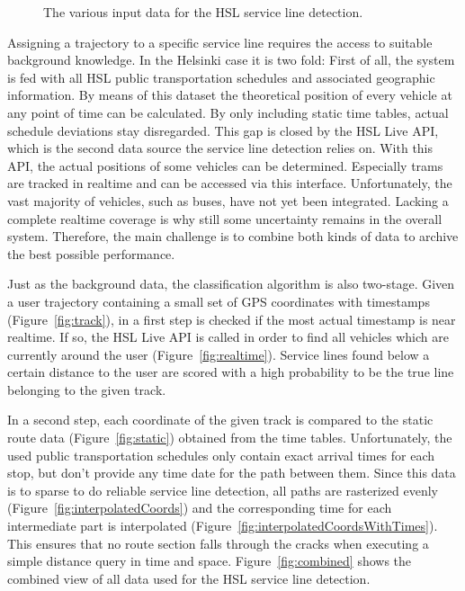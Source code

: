 \documentclass[external]{20120615_deliverable_template_ukob}
\theoremstyle{definition}
\begin{document}
\begin{figure}[ht]
{  \label{fig:interpolatedCoordsWithTimes}
  \setcounter{subfigure}{5}
} 
\caption{
The various input data for the HSL service line detection.
}
\label{fig:SLD}
\end{figure}

Assigning a trajectory to a specific service line requires the access to suitable background knowledge. In the Helsinki case it is two fold:
First of all, the system is fed with all HSL public transportation schedules and associated geographic information. By means of this dataset the theoretical position of every vehicle at any point of time can be calculated. By only including static time tables, actual schedule deviations stay disregarded. This gap is closed by the HSL Live API, which is the second data source the service line detection relies on. With this API, the actual positions of some vehicles can be determined. Especially trams are tracked in realtime and can be accessed via this interface.  Unfortunately, the vast majority of vehicles, such as buses, have not yet been integrated. Lacking a complete realtime coverage is why still some uncertainty remains in the overall system. Therefore, the main challenge is to combine both kinds of data to archive the best possible performance.

Just as the background data, the classification algorithm is also two-stage. Given a user trajectory containing a small set of GPS coordinates with timestamps (Figure~\ref{fig:track}), in a first step is checked if the most actual timestamp is near realtime. If so, the HSL Live API is called in order to find all vehicles which are currently around the user (Figure~\ref{fig:realtime}). Service lines found below a certain distance to the user are scored with a high probability to be the true line belonging to the given track.

In a second step, each coordinate of the given track is compared to the static route data (Figure~\ref{fig:static}) obtained from the time tables. Unfortunately, the used public transportation schedules only contain exact arrival times for each stop, but don't provide any time date for the path between them. Since this data is to sparse to do reliable service line detection, all paths are rasterized evenly (Figure~\ref{fig:interpolatedCoords}) and the corresponding time for each intermediate part is interpolated (Figure~\ref{fig:interpolatedCoordsWithTimes}). This ensures that no route section falls through the cracks when executing a simple distance query in time and space. Figure~\ref{fig:combined} shows the combined view of all data used for the HSL service line detection.
\end{document}
